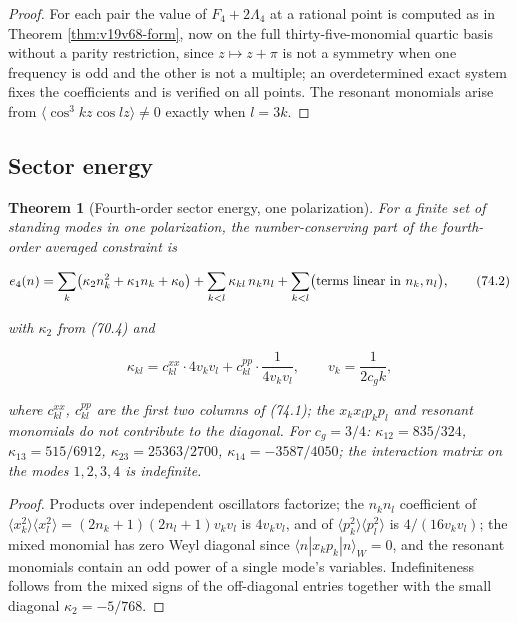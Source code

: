 \documentclass[11pt]{article}
\newtheorem{theorem}{Theorem}[section]
\theoremstyle{remark}
\begin{document}
\begin{proof}
For each pair the value of \(F_4+2\Lambda_4\) at a rational point is
computed as in Theorem \ref{thm:v19v68-form}, now on the full
thirty-five-monomial quartic basis without a parity restriction, since
\(z\mapsto z+\pi\) is not a symmetry when one frequency is odd and the
other is not a multiple; an overdetermined exact system fixes the
coefficients and is verified on all points.  The resonant monomials
arise from \(\langle\cos^3kz\cos lz\rangle\neq0\) exactly when
\(l=3k\).
\end{proof}

\subsection{Sector energy}

\begin{theorem}[Fourth-order sector energy, one polarization]
\label{thm:v19v71-energy}
For a finite set of standing modes in one polarization, the
number-conserving part of the fourth-order averaged constraint is

\[
 e_4(n)=\sum_k\bigl(\kappa_2n_k^2+\kappa_1n_k+\kappa_0\bigr)
 +\sum_{k<l}\kappa_{kl}\,n_kn_l+\sum_{k<l}\bigl(\hbox{terms linear in }n_k,n_l\bigr),
                                                                    \tag{74.2}
\]

with \(\kappa_2\) from (70.4) and

\[
 \kappa_{kl}=c^{xx}_{kl}\cdot4v_kv_l+c^{pp}_{kl}\cdot\frac{1}{4v_kv_l},
 \qquad v_k=\frac1{2c_gk},                                              \tag{74.3}
\]

where \(c^{xx}_{kl}\), \(c^{pp}_{kl}\) are the first two columns of
(74.1); the \(x_kx_lp_kp_l\) and resonant monomials do not contribute to
the diagonal.  For \(c_g=3/4\):
\(\kappa_{12}=835/324\), \(\kappa_{13}=515/6912\),
\(\kappa_{23}=25363/2700\), \(\kappa_{14}=-3587/4050\); the interaction
matrix on the modes \(1,2,3,4\) is indefinite.
\end{theorem}

\begin{proof}
Products over independent oscillators factorize; the \(n_kn_l\)
coefficient of \(\langle x_k^2\rangle\langle x_l^2\rangle=(2n_k+1)(2n_l+1)v_kv_l\)
is \(4v_kv_l\), and of \(\langle p_k^2\rangle\langle p_l^2\rangle\) is
\(4/(16v_kv_l)\); the mixed monomial has zero Weyl diagonal since
\(\langle n|x_kp_k|n\rangle_W=0\), and the resonant monomials contain an
odd power of a single mode's variables.  Indefiniteness follows from
the mixed signs of the off-diagonal entries together with the small
diagonal \(\kappa_2=-5/768\).
\end{proof}
\end{document}

